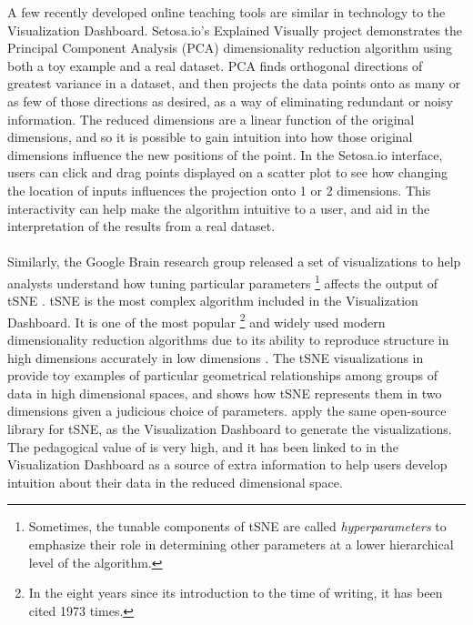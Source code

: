 \documentclass{sigchi}
\begin{document}
%
A few recently developed online teaching tools are similar in technology to the Visualization Dashboard. %
%
Setosa.io's Explained Visually \cite{setosaPCA} project demonstrates the Principal Component Analysis (PCA) dimensionality reduction algorithm \cite{jolliffe2002principal} using both a toy example and a real dataset. %
%
PCA finds orthogonal directions of greatest variance in a dataset, and then projects the data points onto as many or as few of those directions as desired, as a way of eliminating redundant or noisy information. %
%
The reduced dimensions are a linear function of the original dimensions, and so it is possible to gain intuition into how those original dimensions influence the new positions of the point.
%
In the Setosa.io interface, users can click and drag points displayed on a scatter plot to see how changing the location of inputs influences the projection onto 1 or 2 dimensions. %
%
This interactivity can help make the algorithm intuitive to a user, and aid in the interpretation of the results from a real dataset. %
%
\\\\
%
Similarly, the Google Brain research group released a set of visualizations \cite{wattenberg2016how} to help analysts understand how tuning particular parameters%
%
\footnote{Sometimes, the tunable components of tSNE are called \textit{hyperparameters} to emphasize their role in determining other parameters at a lower hierarchical level of the algorithm.} affects the output of tSNE \cite{maaten2008visualizing}. %
%
tSNE is the most complex algorithm included in the Visualization Dashboard. %
%
It is one of the most popular%
%
\footnote{In the eight years since its introduction to the time of writing, it has been cited 1973 times.} %
%
and widely used modern dimensionality reduction algorithms due to its ability to reproduce structure in high dimensions accurately in low dimensions \cite{maaten2008visualizing}. %
%
The tSNE visualizations in \cite{wattenberg2016how} provide toy examples of particular geometrical relationships among groups of data in high dimensional spaces, and shows how tSNE represents them in two dimensions given a judicious choice of parameters. %
%
\cite{wattenberg2016how} apply the same open-source library for tSNE, \cite{wattenberg2016how} as the Visualization Dashboard to generate the visualizations. %
%
The pedagogical value of \cite{wattenberg2016how} is very high, and it has been linked to in the Visualization Dashboard as a source of extra information to help users develop intuition about their data in the reduced dimensional space.%
\end{document}
